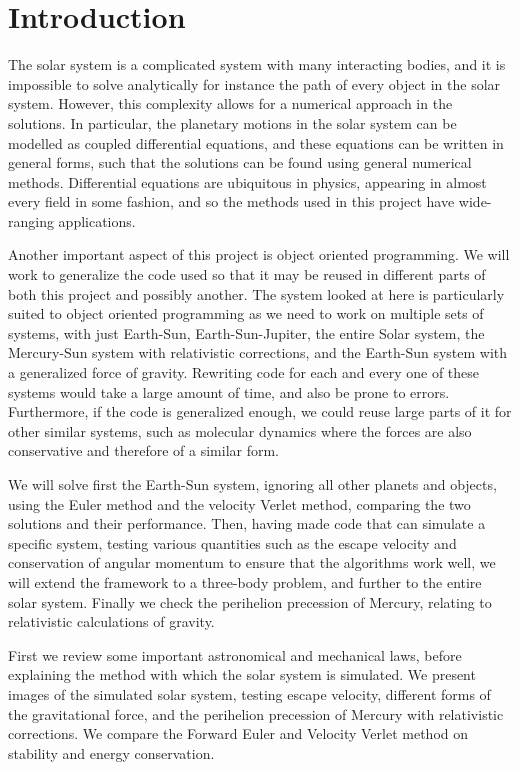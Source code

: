 \documentclass[../main.tex]{subfiles}
\begin{document}
\section{Introduction}\label{sec:introduction}


The solar system is a complicated system with many interacting bodies, and it is impossible to solve analytically for instance the path of every object in the solar system. However, this complexity allows for a numerical approach in the solutions. In particular, the planetary motions in the solar system can be modelled as coupled differential equations, and these equations can be written in general forms, such that the solutions can be found using general numerical methods. Differential equations are ubiquitous in physics, appearing in almost every field in some fashion, and so the methods used in this project have wide-ranging applications.

Another important aspect of this project is object oriented programming. We will work to generalize the code used so that it may be reused in different parts of both this project and possibly another. The system looked at here is particularly suited to object oriented programming as we need to work on multiple sets of systems, with just Earth-Sun, Earth-Sun-Jupiter, the entire Solar system, the Mercury-Sun system with relativistic corrections, and the Earth-Sun system with a generalized force of gravity. Rewriting code for each and every one of these systems would take a large amount of time, and also be prone to errors. Furthermore, if the code is generalized enough, we could reuse large parts of it for other similar systems, such as molecular dynamics where the forces are also conservative and therefore of a similar form.

We will solve first the Earth-Sun system, ignoring all other planets and objects, using the Euler method and the velocity Verlet method, comparing the two solutions and their performance. Then, having made code that can simulate a specific system, testing various quantities such as the escape velocity and conservation of angular momentum to ensure that the algorithms work well, we will extend the framework to a three-body problem, and further to the entire solar system. Finally we check the perihelion precession of Mercury, relating to relativistic calculations of gravity.


First we review some important astronomical and mechanical laws, before explaining the method with which the solar system is simulated. We present images of the simulated solar system, testing escape velocity, different forms of the gravitational force, and the perihelion precession of Mercury with relativistic corrections. We compare the Forward Euler and Velocity Verlet method on stability and energy conservation.
\end{document}
